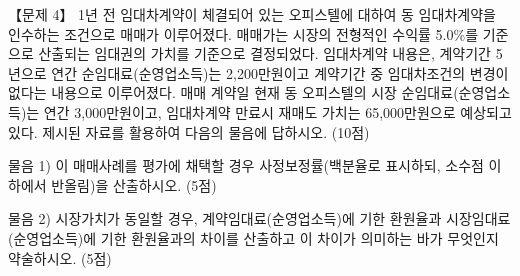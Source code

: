 \begin{longquestion}{【문제 4】}
1년 전 임대차계약이 체결되어 있는 오피스텔에 대하여 동 임대차계약을 인수하는 조건으로 매매가 이루어졌다. 매매가는 시장의 전형적인 수익률 5.0\%를 기준으로 산출되는 임대권의 가치를 기준으로 결정되었다. 임대차계약 내용은, 계약기간 5년으로 연간 순임대료(순영업소득)는 2,200만원이고 계약기간 중 임대차조건의 변경이 없다는 내용으로 이루어졌다. 매매 계약일 현재 동 오피스텔의 시장 순임대료(순영업소득)는 연간 3,000만원이고, 임대차계약 만료시 재매도 가치는 65,000만원으로 예상되고 있다. 제시된 자료를 활용하여 다음의 물음에 답하시오. (10점) \par
\medskip\noindent 물음 1) 이 매매사례를 평가에 채택할 경우 사정보정률(백분율로 표시하되, 소수점 이하에서 반올림)을 산출하시오. (5점) \par
\medskip\noindent 물음 2) 시장가치가 동일할 경우, 계약임대료(순영업소득)에 기한 환원율과 시장임대료(순영업소득)에 기한 환원율과의 차이를 산출하고 이 차이가 의미하는 바가 무엇인지 약술하시오. (5점) \par
\end{longquestion}
